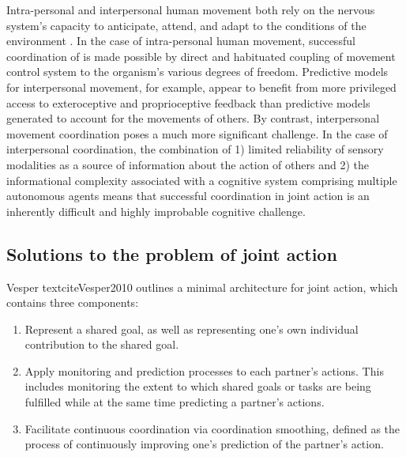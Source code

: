 \begin{CJK}{UTF8}{gbsn}

Intra-personal and interpersonal human movement both rely on the nervous system’s capacity to anticipate, attend, and adapt to the conditions of the environment \citep{Keller2014}.  In the case of intra-personal human movement, successful coordination of is made possible by direct and habituated coupling of movement control system to the organism's various degrees of freedom.  Predictive models for interpersonal movement, for example, appear to benefit from more privileged access to exteroceptive and proprioceptive feedback than predictive models generated to account for the movements of others.  By contrast, interpersonal movement coordination poses a much more significant challenge.  In the case of interpersonal coordination, the combination of 1) limited reliability of sensory modalities as a source of information about the action of others \citep{Wilson2005,Wolpert2003,Frith2007} and 2) the informational complexity associated with a cognitive system comprising multiple autonomous agents \citep{Bernstein1967} means that successful coordination in joint action is an inherently difficult and highly improbable cognitive challenge.

\subsection{Solutions to the problem of joint action}

Vesper textcite{Vesper2010} outlines a minimal architecture for joint action, which contains three components:

\begin{enumerate}
  \item Represent a shared goal, as well as representing one’s own individual contribution to the shared goal.
  \item Apply monitoring and prediction processes to each partner’s actions. This includes monitoring the extent to which shared goals or tasks are being fulfilled while at the same time predicting a partner’s actions.
  \item Facilitate continuous coordination via coordination smoothing, defined as the process of continuously improving one’s prediction of the partner’s action.
\end{enumerate}


\end{CJK}
